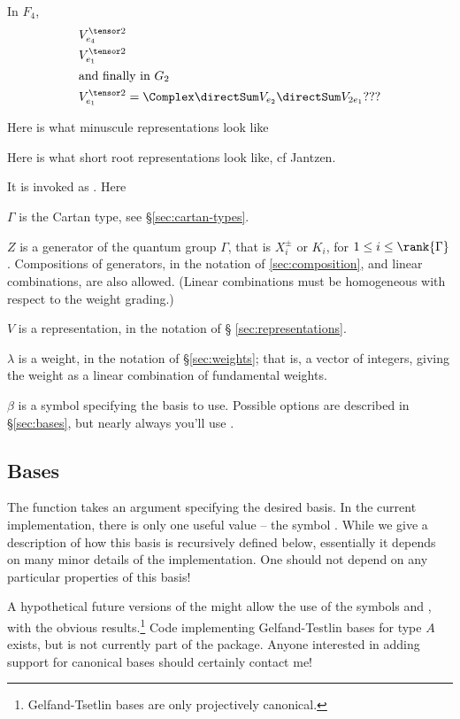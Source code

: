 In $F_4$,
\begin{align*}
V_{e_4}^{\tensor 2}     & \\
V_{e_1}^{\tensor 2}     & \\
\intertext{and finally in $G_2$}
V_{e_1}^{\tensor 2} & = \Complex \directSum V_{e_2} \directSum V_{2e_1} ???
\end{align*}


Here is what minuscule representations look like

Here is what short root representations look like, cf Jantzen.

It is invoked as . Here
\begin{defn}
\item[$\Gamma$] is the Cartan type, see \S \ref{sec:cartan-types}.
\item[$Z$] is a generator of the quantum group $\Gamma$, that is
$X_i^\pm$ or $K_i$, for $1 \leq i \leq \rank{\Gamma}$. Compositions of
generators, in the notation of \ref{sec:composition}, and linear
combinations, are also allowed. (Linear combinations must be homogeneous
with respect to the weight grading.)
\item[$V$] is a representation, in the notation of \S
\ref{sec:representations}.
\item[$\lambda$] is a weight, in the notation of \S \ref{sec:weights};
that is, a vector of integers, giving the weight as a linear combination
of fundamental weights.
\item[$\beta$] is a symbol specifying the basis to use. Possible options are described in \S \ref{sec:bases}, but nearly always you'll use
.
\end{defn}

\subsection{Bases}
The function  takes an argument specifying the
desired basis. In the current implementation, there is only one useful
value -- the symbol . While we give a description
of how this basis is recursively defined below, essentially it depends on
many minor details of the implementation. One should not depend on any
particular properties of this basis!

A hypothetical future versions of the \pkg might allow the use of
the symbols  and , with
the obvious results.\footnote{Gelfand-Tsetlin bases are only projectively
canonical.} Code implementing Gelfand-Testlin bases for type $A$ exists, but is not
currently part of the package. Anyone interested in adding support for
canonical bases should certainly contact me!

